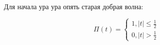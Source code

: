 Для начала ура ура опять старая добрая волна:

\begin{equation}
    \Pi(t) = 
    \begin{cases}
        1, |t| \leq \frac{1}{2} \\
        0, |t| > \frac{1}{2}
    \end{cases}
\end{equation}
